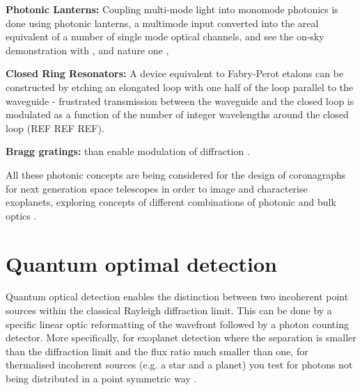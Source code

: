 \documentclass[letterpaper]{ar-1col}
\begin{document}
{\bf Photonic Lanterns: } Coupling multi-mode light into monomode photonics is done using photonic lanterns, a multimode input converted into the areal equivalent of a number of single mode optical channels, \citep{Norris22} and see the on-sky demonstration with \citep{Norris20}, and nature one \cite{Norris20a},

{\bf Closed Ring Resonators: } A device equivalent to Fabry-Perot etalons can be constructed by etching an elongated loop with one half of the loop parallel to the waveguide - frustrated transmission between the waveguide and the closed loop is modulated as a function of the number of integer wavelengths around the closed loop (REF REF REF).

{\bf Bragg gratings: } than enable modulation of diffraction \citep{FaggingerAuer24}.

All these photonic concepts are being considered for the design of coronagraphs for next generation space telescopes in order to image and characterise exoplanets, exploring concepts of different combinations of photonic and bulk optics \citep{Desai23a}.

%


%
%
 



\section{Quantum optimal detection}

Quantum optical detection \citep{Lu18} enables the distinction between two incoherent point sources within the classical Rayleigh diffraction limit.
%
This can be done by a specific linear optic reformatting of the wavefront followed by a photon counting detector.
%
More specifically, for exoplanet detection where the separation is smaller than the diffraction limit and the flux ratio much smaller than one, for thermalised incoherent sources (e.g. a star and a planet) you test for photons not being distributed in a point symmetric way \citep[e.g. ][]{Huang21}.
\end{document}
